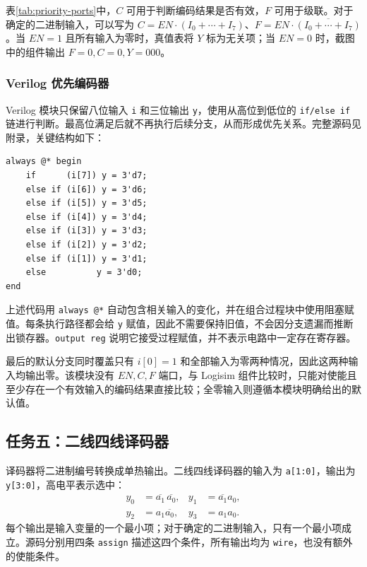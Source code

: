 \documentclass[12pt,a4paper,fontset=fandol]{ctexart}
\begin{document}
表\ref{tab:priority-ports}中，$C$ 可用于判断编码结果是否有效，$F$ 可用于级联。对于确定的二进制输入，可以写为 $C=EN\cdot(I_0+\cdots+I_7)$、$F=EN\cdot\overline{(I_0+\cdots+I_7)}$。当 $EN=1$ 且所有输入为零时，真值表将 $Y$ 标为无关项；当 $EN=0$ 时，截图中的组件输出 $F=0,C=0,Y=000$。

\subsubsection{Verilog 优先编码器}

Verilog 模块只保留八位输入 \texttt{i} 和三位输出 \texttt{y}，使用从高位到低位的 \texttt{if/else if} 链进行判断。最高位满足后就不再执行后续分支，从而形成优先关系。完整源码见附录，关键结构如下：

\begin{lstlisting}[caption={优先编码器的组合逻辑结构}]
always @* begin
    if      (i[7]) y = 3'd7;
    else if (i[6]) y = 3'd6;
    else if (i[5]) y = 3'd5;
    else if (i[4]) y = 3'd4;
    else if (i[3]) y = 3'd3;
    else if (i[2]) y = 3'd2;
    else if (i[1]) y = 3'd1;
    else          y = 3'd0;
end
\end{lstlisting}

上述代码用 \texttt{always @*} 自动包含相关输入的变化，并在组合过程块中使用阻塞赋值。每条执行路径都会给 \texttt{y} 赋值，因此不需要保持旧值，不会因分支遗漏而推断出锁存器。\texttt{output reg} 说明它接受过程赋值，并不表示电路中一定存在寄存器。

最后的默认分支同时覆盖只有 $i[0]=1$ 和全部输入为零两种情况，因此这两种输入均输出零。该模块没有 $EN,C,F$ 端口，与 Logisim 组件比较时，只能对使能且至少存在一个有效输入的编码结果直接比较；全零输入则遵循本模块明确给出的默认值。

\subsection{任务五：二线四线译码器}

译码器将二进制编号转换成单热输出。二线四线译码器的输入为 \texttt{a[1:0]}，输出为 \texttt{y[3:0]}，高电平表示选中：
\begin{align}
  y_0&=\overline{a_1}\,\overline{a_0},&
  y_1&=\overline{a_1}a_0,\\
  y_2&=a_1\overline{a_0},&
  y_3&=a_1a_0.
\end{align}
每个输出是输入变量的一个最小项；对于确定的二进制输入，只有一个最小项成立。源码分别用四条 \texttt{assign} 描述这四个条件，所有输出均为 \texttt{wire}，也没有额外的使能条件。
\end{document}
